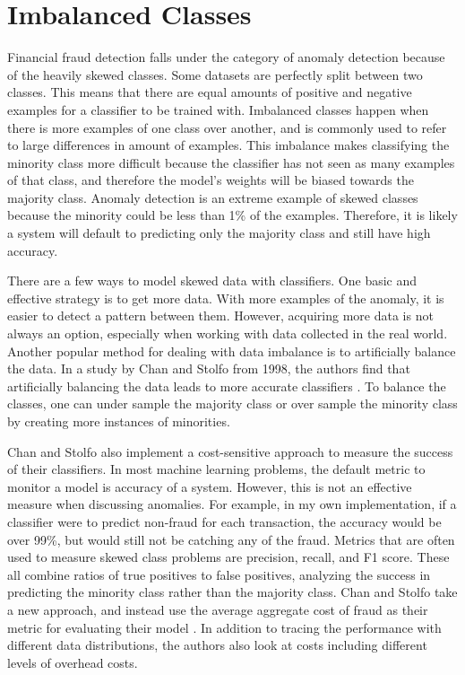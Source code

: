 \documentclass[midd]{thesis}
\begin{document}
\section{Imbalanced Classes} %

Financial fraud detection falls under the category of anomaly detection because of the heavily skewed classes. Some datasets are perfectly split between two classes. This means that there are equal amounts of positive and negative examples for a classifier to be trained with. Imbalanced classes happen when there is more examples of one class over another, and is commonly used to refer to large differences in amount of examples. This imbalance makes classifying the minority class more difficult because the classifier has not seen as many examples of that class, and therefore the model's weights will be biased towards the majority class. Anomaly detection is an extreme example of skewed classes because the minority could be less than 1\% of the examples. Therefore, it is likely a system will default to predicting only the majority class and still have high accuracy.

There are a few ways to model skewed data with classifiers. One basic and effective strategy is to get more data. With more examples of the anomaly, it is easier to detect a pattern between them. However, acquiring more data is not always an option, especially when working with data collected in the real world. Another popular method for dealing with data imbalance is to artificially balance the data.  In a study by Chan and Stolfo from 1998, the authors find that artificially balancing the data leads to more accurate classifiers \cite{Chan}. To balance the classes, one can under sample the majority class or over sample the minority class by creating more instances of minorities.


Chan and Stolfo also implement a cost-sensitive approach to measure the success of their classifiers. In most machine learning problems, the default metric to monitor a model is accuracy of a system. However, this is not an effective measure when discussing anomalies. For example, in my own implementation, if a classifier were to predict non-fraud for each transaction, the accuracy would be over 99\%, but would still not be catching any of the fraud. Metrics that are often used to measure skewed class problems are precision, recall, and F1 score. These all combine ratios of true positives to false positives, analyzing the success in predicting the minority class rather than the majority class. Chan and Stolfo take a new approach, and instead use the average aggregate cost of fraud as their metric for evaluating their model \cite{Chan}. In addition to tracing the performance with different data distributions, the authors also look at costs including different levels of overhead costs.  
\end{document}
